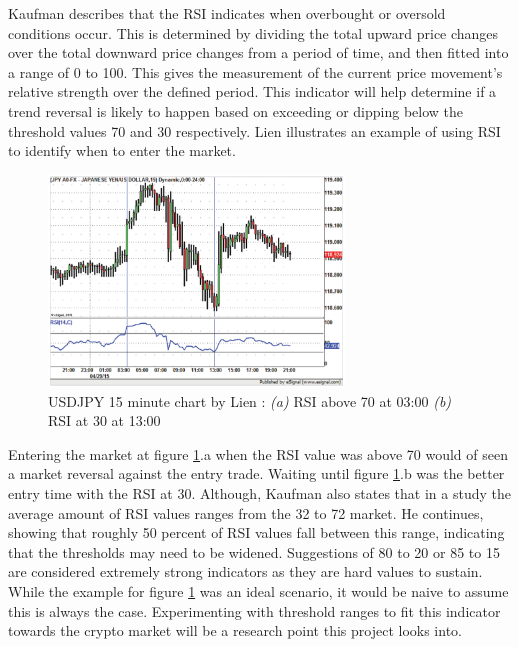 Kaufman \cite{BOOK:Kaufman:2013} describes that the RSI indicates when overbought or oversold conditions occur. This is determined by dividing the total upward price changes over the total downward price changes from a period of time, and then fitted into a range of 0 to 100. This gives the measurement of the current price movement's relative strength over the defined period. This indicator will help determine if a trend reversal is likely to happen based on exceeding or dipping below the threshold values 70 and 30 respectively. Lien \cite{BOOK:Lien:2016} illustrates an example of using RSI to identify when to enter the market. 

\begin{figure}[htb]
    \centering
	\includegraphics[width=0.7\textwidth]{content/graphics/USDJPY-15_min_chart}
	\caption{USDJPY 15 minute chart by Lien \cite{BOOK:Lien:2016}: \textit{(a)} RSI above 70 at 03:00
	\textit{(b)} RSI at 30 at 13:00}
	\label{fig:related:USDJPY_15min}
\end{figure}

Entering the market at figure \ref{fig:related:USDJPY_15min}.a when the RSI value was above 70 would of seen a market reversal against the entry trade. Waiting until figure \ref{fig:related:USDJPY_15min}.b was the better entry time with the RSI at 30. Although, Kaufman also states that in a study the average amount of RSI values ranges from the 32 to 72 market. He continues, showing that roughly 50 percent of RSI values fall between this range, indicating that the thresholds may need to be widened. Suggestions of 80 to 20 or 85 to 15 are considered extremely strong indicators as they are hard values to sustain. While the example for figure \ref{fig:related:USDJPY_15min} was an ideal scenario, it would be naive to assume this is always the case. Experimenting with threshold ranges to fit this indicator towards the crypto market will be a research point this project looks into.

